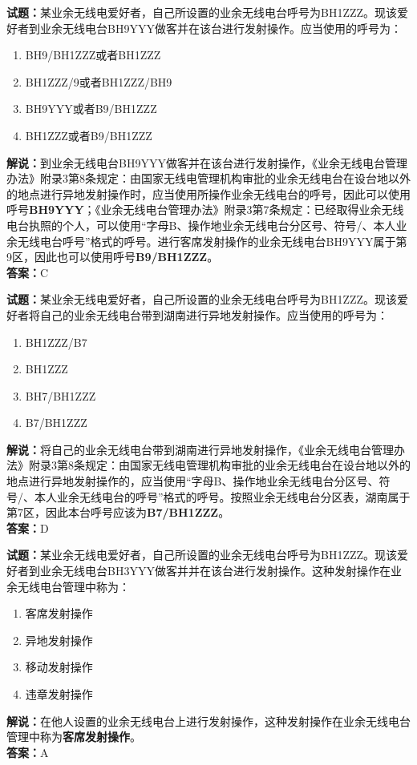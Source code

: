 \documentclass{ctexbook}
\begin{document}
\bigskip

\noindent\textbf{试题：}某业余无线电爱好者，自己所设置的业余无线电台呼号为BH1ZZZ。现该爱好者到业余无线电台BH9YYY做客并在该台进行发射操作。应当使用的呼号为：
\begin{enumerate}[leftmargin=3em]
  \item BH9/BH1ZZZ或者BH1ZZZ
  \item BH1ZZZ/9或者BH1ZZZ/BH9
  \item BH9YYY或者B9/BH1ZZZ
  \item BH1ZZZ或者B9/BH1ZZZ
\end{enumerate}
\noindent\textbf{解说：}到业余无线电台BH9YYY做客并在该台进行发射操作，《业余无线电台管理办法》附录3第8条规定：由国家无线电管理机构审批的业余无线电台在设台地以外的地点进行异地发射操作时，应当使用所操作业余无线电台的呼号，因此可以使用呼号\textbf{BH9YYY}；《业余无线电台管理办法》附录3第7条规定：已经取得业余无线电台执照的个人，可以使用“字母B、操作地业余无线电台分区号、符号/、本人业余无线电台呼号”格式的呼号。进行客席发射操作的业余无线电台BH9YYY属于第9区，因此也可以使用呼号\textbf{B9/BH1ZZZ}。\\\noindent\textbf{答案：}C

\bigskip

\noindent\textbf{试题：}某业余无线电爱好者，自己所设置的业余无线电台呼号为BH1ZZZ。现该爱好者将自己的业余无线电台带到湖南进行异地发射操作。应当使用的呼号为：
\begin{enumerate}[leftmargin=3em]
  \item BH1ZZZ/B7
  \item BH1ZZZ
  \item BH7/BH1ZZZ
  \item B7/BH1ZZZ
\end{enumerate}
\noindent\textbf{解说：}将自己的业余无线电台带到湖南进行异地发射操作，《业余无线电台管理办法》附录3第8条规定：由国家无线电管理机构审批的业余无线电台在设台地以外的地点进行异地发射操作的，应当使用“字母B、操作地业余无线电台分区号、符号/、本人业余无线电台的呼号”格式的呼号。按照业余无线电台分区表，湖南属于第7区，因此本台呼号应该为\textbf{B7/BH1ZZZ}。\\\noindent\textbf{答案：}D

\bigskip

\noindent\textbf{试题：}某业余无线电爱好者，自己所设置的业余无线电台呼号为BH1ZZZ。现该爱好者到业余无线电台BH3YYY做客并并在该台进行发射操作。这种发射操作在业余无线电台管理中称为：
\begin{enumerate}[leftmargin=3em]
  \item 客席发射操作
  \item 异地发射操作
  \item 移动发射操作
  \item 违章发射操作
\end{enumerate}
\noindent\textbf{解说：}在他人设置的业余无线电台上进行发射操作，这种发射操作在业余无线电台管理中称为\textbf{客席发射操作}。\\\noindent\textbf{答案：}A
\end{document}

